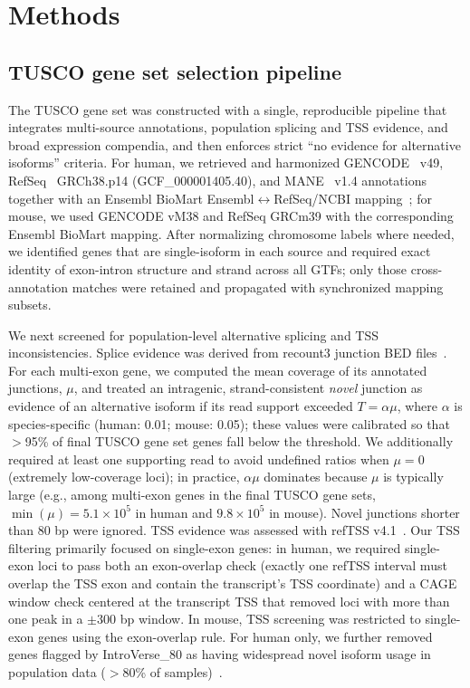 \documentclass[pdflatex,sn-nature]{sn-jnl}%
\newcommand{\tuscoGeneSet}{TUSCO gene set}
\begin{document}

\section{Methods}

\subsection{\tuscoGeneSet{} selection pipeline}

The \tuscoGeneSet{} was constructed with a single, reproducible pipeline that integrates multi-source annotations, population splicing and TSS evidence, and broad expression compendia, and then enforces strict ``no evidence for alternative isoforms'' criteria. For human, we retrieved and harmonized GENCODE~\cite{harrow_gencode_2012} v49, RefSeq~\cite{oleary_reference_2016} GRCh38.p14 (GCF\_000001405.40), and MANE~\cite{morales_joint_2022} v1.4 annotations together with an Ensembl BioMart Ensembl$\leftrightarrow$RefSeq/NCBI mapping~\cite{kinsella_ensembl_2011}; for mouse, we used GENCODE vM38 and RefSeq GRCm39 with the corresponding Ensembl BioMart mapping. After normalizing chromosome labels where needed, we identified genes that are single-isoform in each source and required exact identity of exon-intron structure and strand across all GTFs; only those cross-annotation matches were retained and propagated with synchronized mapping subsets.

We next screened for population-level alternative splicing and TSS inconsistencies. Splice evidence was derived from recount3 junction BED files~\cite{wilks_recount3_2021}. For each multi-exon gene, we computed the mean coverage of its annotated junctions, $\mu$, and treated an intragenic, strand-consistent \emph{novel} junction as evidence of an alternative isoform if its read support exceeded $T=\alpha\mu$, where $\alpha$ is species-specific (human: 0.01; mouse: 0.05); these values were calibrated so that $>$95\% of final \tuscoGeneSet{} genes fall below the threshold. We additionally required at least one supporting read to avoid undefined ratios when $\mu=0$ (extremely low-coverage loci); in practice, $\alpha\mu$ dominates because $\mu$ is typically large (e.g., among multi-exon genes in the final \tuscoGeneSet{}s, $\min(\mu)=5.1\times10^5$ in human and $9.8\times10^5$ in mouse). Novel junctions shorter than 80 bp were ignored. TSS evidence was assessed with refTSS v4.1~\cite{abugessaisa_reftss_2019}. Our TSS filtering primarily focused on single-exon genes: in human, we required single-exon loci to pass both an exon-overlap check (exactly one refTSS interval must overlap the TSS exon and contain the transcript's TSS coordinate) and a CAGE window check centered at the transcript TSS that removed loci with more than one peak in a $\pm 300$ bp window. In mouse, TSS screening was restricted to single-exon genes using the exon-overlap rule. For human only, we further removed genes flagged by IntroVerse\_80 as having widespread novel isoform usage in population data ($>$80\% of samples)~\cite{garcia-ruiz_introverse_2023}.
\end{document}
